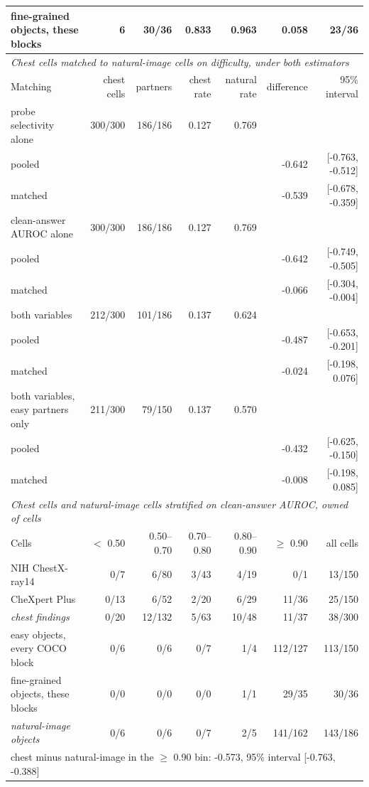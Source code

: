 \begin{table}[htbp]
{\begin{tabular}{lrrrrrr}
fine-grained objects, these blocks & 6 & 30/36 & 0.833 & 0.963 & 0.058 & 23/36 \\
\midrule
\multicolumn{7}{l}{\textit{Chest cells matched to natural-image cells on difficulty, under both estimators}} \\
Matching & chest cells & partners & chest rate & natural rate & difference & 95\% interval \\
\midrule
probe selectivity alone & 300/300 & 186/186 & 0.127 & 0.769 &  &  \\
\quad pooled &  &  &  &  & -0.642 & [-0.763, -0.512] \\
\quad matched &  &  &  &  & -0.539 & [-0.678, -0.359] \\
clean-answer AUROC alone & 300/300 & 186/186 & 0.127 & 0.769 &  &  \\
\quad pooled &  &  &  &  & -0.642 & [-0.749, -0.505] \\
\quad matched &  &  &  &  & -0.066 & [-0.304, -0.004] \\
both variables & 212/300 & 101/186 & 0.137 & 0.624 &  &  \\
\quad pooled &  &  &  &  & -0.487 & [-0.653, -0.201] \\
\quad matched &  &  &  &  & -0.024 & [-0.198, 0.076] \\
both variables, easy partners only & 211/300 & 79/150 & 0.137 & 0.570 &  &  \\
\quad pooled &  &  &  &  & -0.432 & [-0.625, -0.150] \\
\quad matched &  &  &  &  & -0.008 & [-0.198, 0.085] \\
\midrule
\multicolumn{7}{l}{\textit{Chest cells and natural-image cells stratified on clean-answer AUROC, owned of cells}} \\
Cells & $<$ 0.50 & 0.50--0.70 & 0.70--0.80 & 0.80--0.90 & $\geq$ 0.90 & all cells \\
\midrule
NIH ChestX-ray14 & 0/7 & 6/80 & 3/43 & 4/19 & 0/1 & 13/150 \\
CheXpert Plus & 0/13 & 6/52 & 2/20 & 6/29 & 11/36 & 25/150 \\
\textit{chest findings} & 0/20 & 12/132 & 5/63 & 10/48 & 11/37 & 38/300 \\
easy objects, every COCO block & 0/6 & 0/6 & 0/7 & 1/4 & 112/127 & 113/150 \\
fine-grained objects, these blocks & 0/0 & 0/0 & 0/0 & 1/1 & 29/35 & 30/36 \\
\textit{natural-image objects} & 0/6 & 0/6 & 0/7 & 2/5 & 141/162 & 143/186 \\
\multicolumn{7}{l}{\quad chest minus natural-image in the $\geq$ 0.90 bin: -0.573, 95\% interval [-0.763, -0.388]} \\
\bottomrule
\end{tabular}}
\end{table}
